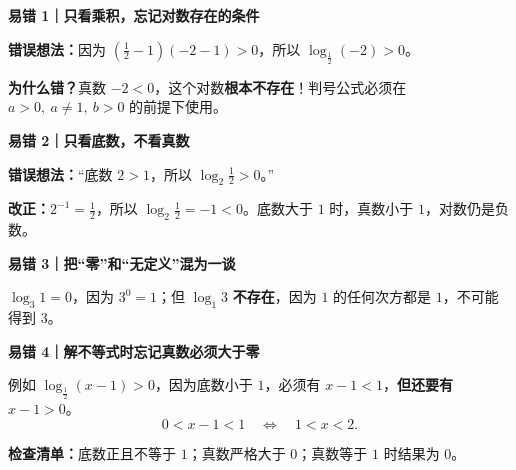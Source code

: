 \begin{trapbox}
  \textbf{\textcolor{CTrap}{易错 1｜只看乘积，忘记对数存在的条件}}

  \textbf{错误想法：}因为 $(\frac12-1)(-2-1)>0$，所以 $\log_{\frac12}(-2)>0$。

  \textbf{为什么错？}真数 $-2<0$，这个对数\textbf{根本不存在}！判号公式必须在 $a>0,\ a\neq1,\ b>0$ 的前提下使用。
  \begin{center}
  
  \end{center}

  \medskip
  \textbf{\textcolor{CTrap}{易错 2｜只看底数，不看真数}}

  \textbf{错误想法：}“底数 $2>1$，所以 $\log_2\frac12>0$。”

  \textbf{改正：}$2^{-1}=\frac12$，所以 $\log_2\frac12=-1<0$。底数大于 $1$ 时，真数小于 $1$，对数仍是负数。
  \begin{center}
  
  \end{center}

  \medskip
  \textbf{\textcolor{CTrap}{易错 3｜把“零”和“无定义”混为一谈}}

  $\log_3 1=0$，因为 $3^0=1$；但 $\log_1 3$ \textbf{不存在}，因为 $1$ 的任何次方都是 $1$，不可能得到 $3$。
  \begin{center}
  
  \end{center}

  \medskip
  \textbf{\textcolor{CTrap}{易错 4｜解不等式时忘记真数必须大于零}}

  例如 $\log_{\frac12}(x-1)>0$，因为底数小于 $1$，必须有 $x-1<1$，\textbf{但还要有 $x-1>0$}。
  \[
    0<x-1<1\quad\Longleftrightarrow\quad\boxed{1<x<2}.
  \]
  \begin{center}
  
  \end{center}
  \textbf{检查清单：}底数正且不等于 $1$；真数严格大于 $0$；真数等于 $1$ 时结果为 $0$。
\end{trapbox}
